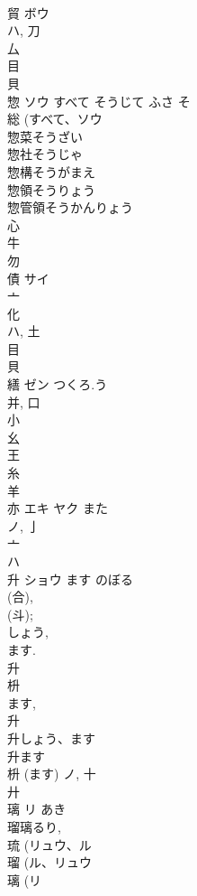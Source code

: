 \documentclass[8pt]{extreport}
\begin{document}
\begin{CJK}{UTF8}{min}
\\	貿	ボウ		
\\	ハ, 刀 
\\	厶 
\\	目 
\\	貝 
\\	惣	ソウ	すべて そうじて ふさ そ	
\\	総 (すべて、ソウ 
\\	惣菜そうざい
\\	惣社そうじゃ
\\	惣構そうがまえ
\\	惣領そうりょう
\\	惣管領そうかんりょう
\\	心 
\\	牛 
\\	勿 
\\	債	サイ		
\\	亠 
\\	化 
\\	ハ, 土 
\\	目 
\\	貝 
\\	繕	ゼン	つくろ.う	
\\	并, 口 
\\	小 
\\	幺 
\\	王 
\\	糸 
\\	羊 
\\	亦	エキ ヤク	また	
\\	ノ, 亅 
\\	亠 
\\	ハ	
\\	升	ショウ	ます のぼる	
\\	(合), 
\\	(斗); 
\\	しょう, 
\\	ます. 
\\	升 
\\	枡 
\\	ます, 
\\	升 
\\	升しょう、ます
\\	升ます
\\	枡 (ます)	ノ, 十 
\\	廾 
\\	璃	リ	あき	
\\	瑠璃るり, 
\\	琉 (リュウ、ル 
\\	瑠 (ル、リュウ 
\\	璃 (リ 

\end{CJK}
\end{document}

